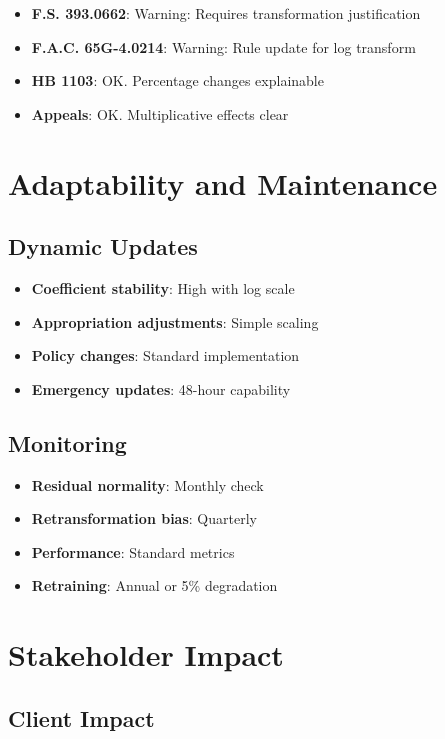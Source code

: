 \begin{itemize}
    \item \textbf{F.S. 393.0662}: Warning: Requires transformation justification
    \item \textbf{F.A.C. 65G-4.0214}: Warning: Rule update for log transform
    \item \textbf{HB 1103}: OK.  Percentage changes explainable
    \item \textbf{Appeals}: OK.  Multiplicative effects clear
\end{itemize}

\section{Adaptability and Maintenance}

\subsection{Dynamic Updates}

\begin{itemize}
    \item \textbf{Coefficient stability}: High with log scale
    \item \textbf{Appropriation adjustments}: Simple scaling
    \item \textbf{Policy changes}: Standard implementation
    \item \textbf{Emergency updates}: 48-hour capability
\end{itemize}

\subsection{Monitoring}

\begin{itemize}
    \item \textbf{Residual normality}: Monthly check
    \item \textbf{Retransformation bias}: Quarterly
    \item \textbf{Performance}: Standard metrics
    \item \textbf{Retraining}: Annual or 5\% degradation
\end{itemize}

\section{Stakeholder Impact}

\subsection{Client Impact}

